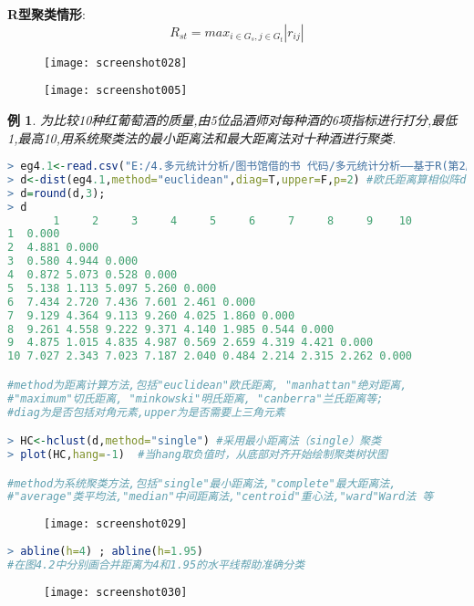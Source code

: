 \documentclass[11pt,a4paper,oneside]{book}
\newtheorem{e}{例}
\begin{document}
\textbf{R型聚类情形}:\[R_{st}={max_{i\in G_s, j\in G_t}|r_{ij}|}\]
\begin{figure}[H]
	\texttt{[image: screenshot028]}
	\label{fig:screenshot028}
\end{figure}
\begin{figure}[H]
	\texttt{[image: screenshot005]}
\end{figure}
\begin{e}
	为比较10种红葡萄酒的质量,由5位品酒师对每种酒的6项指标进行打分,最低1,最高10,用系统聚类法的最小距离法和最大距离法对十种酒进行聚类.
\end{e}
\begin{lstlisting}[language=r]
> eg4.1<-read.csv("E:/4.多元统计分析/图书馆借的书 代码/多元统计分析——基于R(第2版) R-data/eg4.1.csv")
> d<-dist(eg4.1,method="euclidean",diag=T,upper=F,p=2) #欧氏距离算相似阵d
> d=round(d,3);
> d
       1     2     3     4     5     6     7     8     9    10
1  0.000                                                      
2  4.881 0.000                                                
3  0.580 4.944 0.000                                          
4  0.872 5.073 0.528 0.000                                    
5  5.138 1.113 5.097 5.260 0.000                              
6  7.434 2.720 7.436 7.601 2.461 0.000                        
7  9.129 4.364 9.113 9.260 4.025 1.860 0.000                  
8  9.261 4.558 9.222 9.371 4.140 1.985 0.544 0.000            
9  4.875 1.015 4.835 4.987 0.569 2.659 4.319 4.421 0.000      
10 7.027 2.343 7.023 7.187 2.040 0.484 2.214 2.315 2.262 0.000

#method为距离计算方法,包括"euclidean"欧氏距离, "manhattan"绝对距离,
#"maximum"切氏距离, "minkowski"明氏距离, "canberra"兰氏距离等;
#diag为是否包括对角元素,upper为是否需要上三角元素

> HC<-hclust(d,method="single") #采用最小距离法（single）聚类
> plot(HC,hang=-1)  #当hang取负值时，从底部对齐开始绘制聚类树状图

#method为系统聚类方法,包括"single"最小距离法,"complete"最大距离法,
#"average"类平均法,"median"中间距离法,"centroid"重心法,"ward"Ward法 等
\end{lstlisting}
\begin{figure}[H]
	\centering
	\texttt{[image: screenshot029]}
	\label{fig:screenshot029}
\end{figure}

\begin{lstlisting}[language=r]
> abline(h=4) ; abline(h=1.95)  
#在图4.2中分别画合并距离为4和1.95的水平线帮助准确分类
\end{lstlisting}
\begin{figure}[H]
	\centering
	\texttt{[image: screenshot030]}
	\label{fig:screenshot030}
\end{figure}
\end{document}
